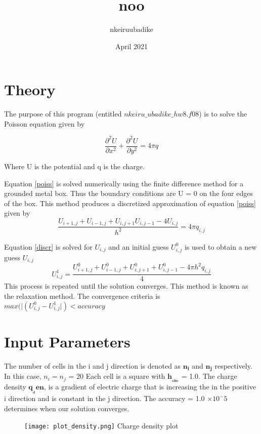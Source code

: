 \documentclass{article}
\title{noo}
\author{nkeiruubadike }
\date{April 2021}
\begin{document}
\section{Theory}
The purpose of this program (entitled $nkeiru\_ubadike\_hw8.f08$) is to solve the Poisson equation given by

\begin{equation}
  \frac{\partial^2 U}{\partial x^2}+\frac{\partial^2 U}{\partial y^2} =4\pi q
  \label{poiss}
\end{equation}

Where U is the potential and q is the charge.

Equation \ref{poiss} is solved numerically using the finite difference method for a grounded metal box. Thus the boundary conditions are U = 0 on the four edges of the box. This method produces a discretized approximation of equation \ref{poiss} given by
\begin{equation}\label{discr}
  \frac{U_{i+1, j} + U_{i-1, j} + U_{i,j+1}U_{i,j-1} -4U_{i,j}}{h^2} = 4\pi q_{i,j}
\end{equation}

Equation \ref{discr} is solved for $U_{i,j}$ and an initial guess $U_{i,j}^0$ is used to obtain a new guess $U_{i,j}$
\begin{equation}
  U_{i,j}^1 = \frac{U_{i + 1,j}^0 + U_{i - 1,j}^0 + U_{i,j+ 1}^0 + U_{i,j-1}^0 - 4\pi h^2 q_{i,j}}{4}   
\end{equation}
This process is repeated until the solution converges. This method is known as the relaxation method. The convergence criteria is $max(\lvert(U_{i,j}^0 - U_{i,j}^1\rvert)<  accuracy $ 
\section{Input Parameters}

The number of cells in the i and j direction is denoted as $\mathbf{n_i}$ and $\mathbf{n_j}$ respectively. In this case, $n_i = n_j$ = 20 Each cell is a square with $\mathbf{h__{size}}$ = 1.0. The charge density $\mathbf{q__den}$, is a gradient of electric charge that is increasing the in the positive i direction and is constant in the j direction.  The accuracy = 1.0 $\times 10 ^-5$ determines when our solution converges.

\begin{figure}[h]
  \begin{center}
  \texttt{[image: plot\_density.png]}
  \label{q_density} Charge density plot
\end{center}
\end{figure}
\end{document}
